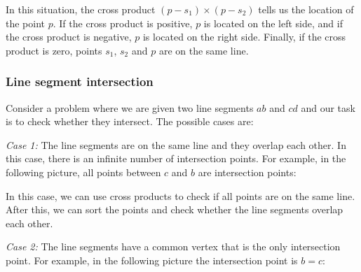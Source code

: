 In this situation,
the cross product $(p-s_1) \times (p-s_2)$
tells us the location of the point $p$.
If the cross product is positive,
$p$ is located on the left side,
and if the cross product is negative,
$p$ is located on the right side.
Finally, if the cross product is zero,
points $s_1$, $s_2$ and $p$ are on the same line.

\subsubsection{Line segment intersection}


Consider a problem where we are given two line segments
$ab$ and $cd$ and our task is to check whether they
intersect. The possible cases are:

\textit{Case 1:}
The line segments are on the same line
and they overlap each other.
In this case, there is an infinite number of
intersection points.
For example, in the following picture,
all points between $c$ and $b$ are
intersection points:
\begin{center}
\end{center}

In this case, we can use cross products to
check if all points are on the same line.
After this, we can sort the points and check
whether the line segments overlap each other.

\textit{Case 2:}
The line segments have a common vertex
that is the only intersection point.
For example, in the following picture the
intersection point is $b=c$:

\begin{center}
\end{center}

